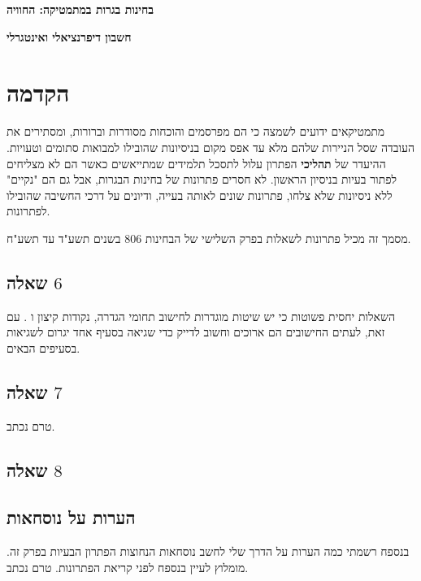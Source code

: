 

\thispagestyle{empty}

\begin{center}
\textbf{\LARGE בחינות בגרות במתמטיקה: החוויה}

\bigskip
\bigskip

\textbf{\LARGE חשבון דיפרנציאלי ואינטגרלי}
\end{center}



\section*{הקדמה}

מתמטיקאים ידועים לשמצה כי הם מפרסמים והוכחות מסודרות וברורות, ומסתירים את העובדה שסל הניירות שלהם מלא עד אפס מקום בניסיונות שהובילו למבואות סתומים וטעויות. ההיעדר של 
\textbf{תהליכי}
הפתרון עלול לתסכל תלמידים שמתייאשים כאשר הם לא מצליחים לפתור בעיות בניסיון הראשון. לא חסרים פתרונות של בחינות הבגרות, אבל גם הם "נקיים" ללא ניסיונות שלא צלחו, פתרונות שונים לאותה בעייה, ודיונים על דרכי החשיבה שהובילו לפתרונות.

מסמך זה מכיל פתרונות לשאלות בפרק השלישי של הבחינות 
$806$
בשנים תשע"ד עד תשע"ח. 

\subsection*{שאלה 
$6$}

השאלות יחסית פשוטות כי יש שיטות מוגדרות לחישוב תחומי הגדרה, נקודות קיצון ו%
\asms{}.
עם זאת, לעתים החישובים הם ארוכים וחשוב לדייק כדי שגיאה בסעיף אחד יגרום לשגיאות בסעיפים הבאים.

\subsection*{שאלה 
$7$}

טרם נכתב.

\subsection*{שאלה 
$8$}

\subsection*{הערות על נוסחאות}

בנספח רשמתי כמה הערות על הדרך שלי לחשב נוסחאות הנחוצות הפתרון הבעיות בפרק זה. מומלוץ לעיין בנספח לפני קריאת הפתרונות.
טרם נכתב.
